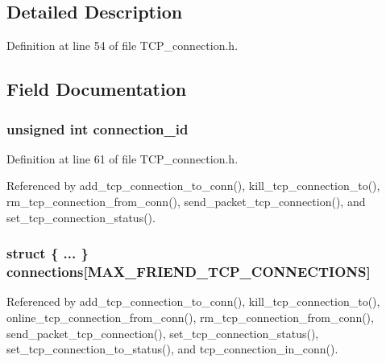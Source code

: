 \subsection{Detailed Description}


Definition at line 54 of file T\+C\+P\+\_\+connection.\+h.



\subsection{Field Documentation}
\hypertarget{struct_t_c_p___connection__to_ababc90484b0c796e004410411e723f5e}{
\subsubsection[{connection\+\_\+id}]{\setlength{\rightskip}{0pt plus 5cm}unsigned int connection\+\_\+id}}\label{struct_t_c_p___connection__to_ababc90484b0c796e004410411e723f5e}


Definition at line 61 of file T\+C\+P\+\_\+connection.\+h.



Referenced by add\+\_\+tcp\+\_\+connection\+\_\+to\+\_\+conn(), kill\+\_\+tcp\+\_\+connection\+\_\+to(), rm\+\_\+tcp\+\_\+connection\+\_\+from\+\_\+conn(), send\+\_\+packet\+\_\+tcp\+\_\+connection(), and set\+\_\+tcp\+\_\+connection\+\_\+status().

\hypertarget{struct_t_c_p___connection__to_a18a4dcc3680af788c1caa33edf6d893f}{
\subsubsection[{connections}]{\setlength{\rightskip}{0pt plus 5cm}struct \{ ... \}   connections\mbox{[}{\bf M\+A\+X\+\_\+\+F\+R\+I\+E\+N\+D\+\_\+\+T\+C\+P\+\_\+\+C\+O\+N\+N\+E\+C\+T\+I\+O\+N\+S}\mbox{]}}}\label{struct_t_c_p___connection__to_a18a4dcc3680af788c1caa33edf6d893f}


Referenced by add\+\_\+tcp\+\_\+connection\+\_\+to\+\_\+conn(), kill\+\_\+tcp\+\_\+connection\+\_\+to(), online\+\_\+tcp\+\_\+connection\+\_\+from\+\_\+conn(), rm\+\_\+tcp\+\_\+connection\+\_\+from\+\_\+conn(), send\+\_\+packet\+\_\+tcp\+\_\+connection(), set\+\_\+tcp\+\_\+connection\+\_\+status(), set\+\_\+tcp\+\_\+connection\+\_\+to\+\_\+status(), and tcp\+\_\+connection\+\_\+in\+\_\+conn().

